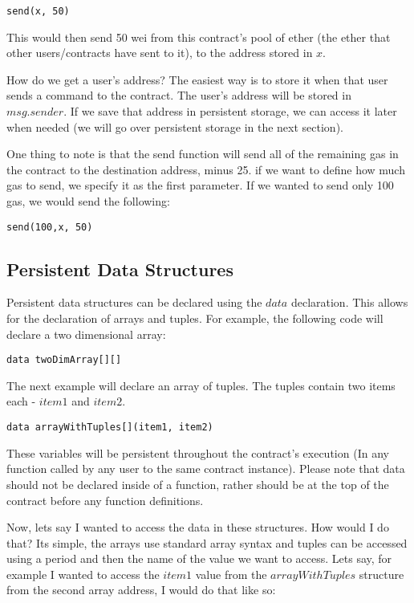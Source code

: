 \documentclass[12pt]{article}
\begin{document}
\begin{verbatim}
send(x, 50)
\end{verbatim}

This would then send 50 wei from this contract's pool of ether (the ether that other users/contracts have sent to it), to the address stored in $x$.

How do we get a user's address? The easiest way is to store it when that user sends a command to the contract. The user's address will be stored in $msg.sender$. If we save that address in persistent storage, we can access it later when needed \cite{Serpent} (we will go over persistent storage in the next section).

One thing to note is that the send function will send all of the remaining gas in the contract to the destination address, minus 25. if we want to define how much gas to send, we specify it as the first parameter. If we wanted to send only 100 gas, we would send the following: 

\begin{verbatim}
send(100,x, 50)
\end{verbatim}

\subsection{Persistent Data Structures}

Persistent data structures can be declared using the $data$ declaration. This allows for the declaration of arrays and tuples. For example, the following code will declare a two dimensional array:

\begin{verbatim}
data twoDimArray[][]
\end{verbatim}

The next example will declare an array of tuples. The tuples contain two items each - $item1$ and $item2$.

\begin{verbatim}
data arrayWithTuples[](item1, item2)
\end{verbatim}

These variables will be persistent throughout the contract's execution (In any function called by any user to the same contract instance). Please note that data should not be declared inside of a function, rather should be at the top of the contract before any function definitions.

Now, lets say I wanted to access the data in these structures. How would I do that? Its simple, the arrays use standard array syntax and tuples can be accessed using a period and then the name of the value we want to access. Lets say, for example I wanted to access the $item1$ value from the $arrayWithTuples$ structure from the second array address, I would do that like so:
\end{document}
